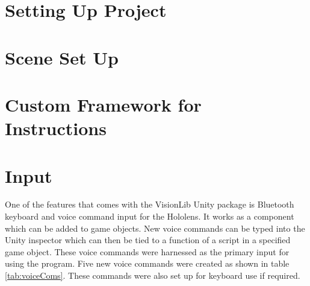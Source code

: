 \documentclass{l4proj}
\begin{document}
\section{Setting Up Project}
\section{Scene Set Up}

\section{Custom Framework for Instructions}

\section{Input}

One of the features that comes with the VisionLib Unity package is Bluetooth keyboard and voice command input for the Hololens. It works as a component which can be added to game objects. New voice commands can be typed into the Unity inspector which can then be tied to a function of a script in a specified game object. These voice commands were harnessed as the primary input for using the program. Five new voice commands were created as shown in table \ref{tab:voiceComs}. These commands were also set up for keyboard use if required.
\end{document}
